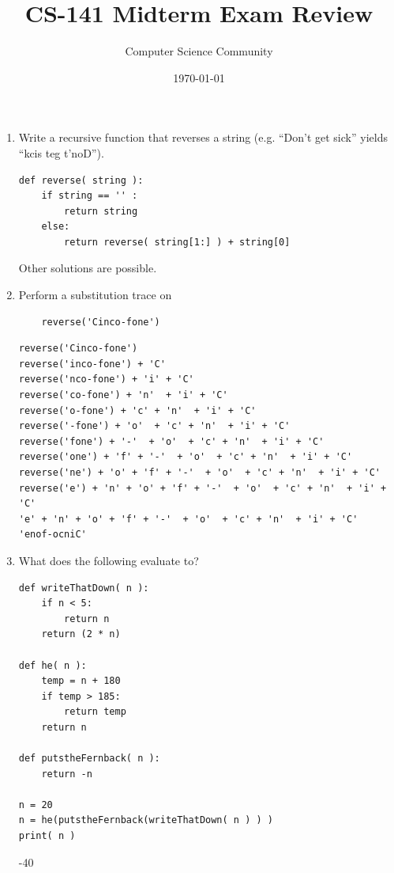 \documentclass[11pt]{article}
\title{CS-141 Midterm Exam Review}
\author{Computer Science Community}
\date{\today}
\newenvironment{answer}{\large\lstset{basicstyle=\large}\color{white}}{}
\newenvironment{answer}{\large\lstset{basicstyle=\large}\color{red}}{}
\begin{document}
\header

\begin{enumerate}
    \item\label{reverse()} Write a recursive function that reverses a string (e.g. ``Don't
        get sick'' yields ``kcis teg t'noD'').

\begin{answer}
\begin{lstlisting}
def reverse( string ):
    if string == '' :
        return string
    else:
        return reverse( string[1:] ) + string[0]
\end{lstlisting}
Other solutions are possible.
\end{answer}

    \item Perform a substitution trace on 
    \begin{lstlisting}
    reverse('Cinco-fone')
    \end{lstlisting}

\begin{answer}
\begin{lstlisting}
reverse('Cinco-fone')
reverse('inco-fone') + 'C'
reverse('nco-fone') + 'i' + 'C'
reverse('co-fone') + 'n'  + 'i' + 'C'
reverse('o-fone') + 'c' + 'n'  + 'i' + 'C'
reverse('-fone') + 'o'  + 'c' + 'n'  + 'i' + 'C'
reverse('fone') + '-'  + 'o'  + 'c' + 'n'  + 'i' + 'C'
reverse('one') + 'f' + '-'  + 'o'  + 'c' + 'n'  + 'i' + 'C'
reverse('ne') + 'o' + 'f' + '-'  + 'o'  + 'c' + 'n'  + 'i' + 'C'
reverse('e') + 'n' + 'o' + 'f' + '-'  + 'o'  + 'c' + 'n'  + 'i' + 'C'
'e' + 'n' + 'o' + 'f' + '-'  + 'o'  + 'c' + 'n'  + 'i' + 'C'
'enof-ocniC'
\end{lstlisting}
\end{answer}

 \item What does the following evaluate to?
    \begin{lstlisting}
def writeThatDown( n ):
    if n < 5:
        return n
    return (2 * n)

def he( n ):
    temp = n + 180
    if temp > 185:
        return temp
    return n

def putstheFernback( n ):
    return -n

n = 20
n = he(putstheFernback(writeThatDown( n ) ) )
print( n )
    \end{lstlisting}
    \begin{answer}
        -40
    \end{answer}


\end{enumerate}
\end{document}
